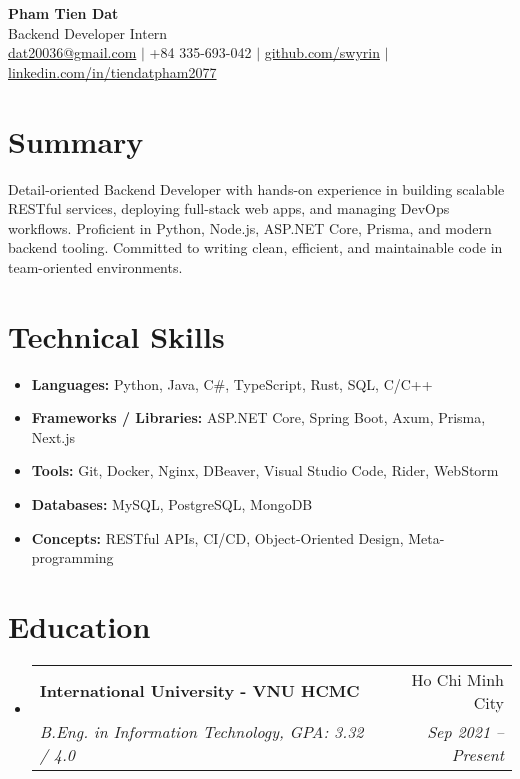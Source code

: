 \documentclass[letterpaper,11pt]{article}
\makeatletter
\newcommand{\resumeSubheading}[4]{
  \item
    \begin{tabular*}{\textwidth}{l@{\extracolsep{\fill}}r}
      \textbf{#1} & #2 \\
      \textit{#3} & \textit{#4} \\
    \end{tabular*}
}
\newcommand{\resumeSectionStart}{\begin{itemize}[leftmargin=0.15in, label={}]}
\newcommand{\resumeSectionEnd}{\end{itemize}}
\makeatother
\begin{document}
\begin{center}
  \textbf{\Huge Pham Tien Dat} \\ \vspace{1pt}
  Backend Developer Intern \\ \vspace{1pt}
  \href{mailto:dat20036@gmail.com}{dat20036@gmail.com} $|$
  +84 335-693-042 $|$
  \href{https://github.com/swyrin}{github.com/swyrin} $|$
  \href{https://linkedin.com/in/tiendatpham2077}{linkedin.com/in/tiendatpham2077}
\end{center}

\section*{Summary}
Detail-oriented Backend Developer with hands-on experience in building scalable RESTful services, deploying full-stack web apps, and managing DevOps workflows. Proficient in Python, Node.js, ASP.NET Core, Prisma, and modern backend tooling. Committed to writing clean, efficient, and maintainable code in team-oriented environments.

\section*{Technical Skills}
\resumeSectionStart
  \item \textbf{Languages:} Python, Java, C\#, TypeScript, Rust, SQL, C/C++
  \item \textbf{Frameworks / Libraries:} ASP.NET Core, Spring Boot, Axum, Prisma, Next.js
  \item \textbf{Tools:} Git, Docker, Nginx, DBeaver, Visual Studio Code, Rider, WebStorm
  \item \textbf{Databases:} MySQL, PostgreSQL, MongoDB
  \item \textbf{Concepts:} RESTful APIs, CI/CD, Object-Oriented Design, Meta-programming
\resumeSectionEnd

\section*{Education}
\resumeSectionStart
  \resumeSubheading
    {International University - VNU HCMC}{Ho Chi Minh City}
    {B.Eng. in Information Technology, GPA: 3.32 / 4.0}{Sep 2021 -- Present}
\resumeSectionEnd

\end{document}
